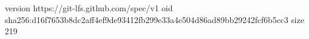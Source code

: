 version https://git-lfs.github.com/spec/v1
oid sha256:d16f7653b8dc2aff4ef9de93412fb299e33a4e504d86ad89bb29242fcf6b5cc3
size 219
